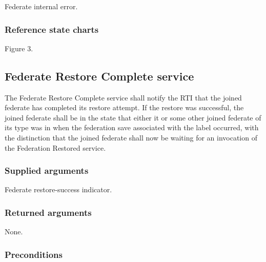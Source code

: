 \begin{stdalphalist}
    \item Federate internal error.
\end{stdalphalist}

\subsubsection{Reference state charts}

\begin{stdalphalist}
    \item Figure 3.
\end{stdalphalist}

\subsection{Federate Restore Complete service}

The Federate Restore Complete service shall notify the RTI that the joined federate has completed its restore attempt. If the restore was successful, the joined federate shall be in the state that either it or some other joined federate of its type was in when the federation save associated with the label occurred, with the distinction that the joined federate shall now be waiting for an invocation of the Federation Restored \rtiinitiated{} service.

\subsubsection{Supplied arguments}

\begin{stdalphalist}
    \item Federate restore-success indicator.
\end{stdalphalist}

\subsubsection{Returned arguments}

\begin{stdalphalist}
    \item None.
\end{stdalphalist}

\subsubsection{Preconditions}

